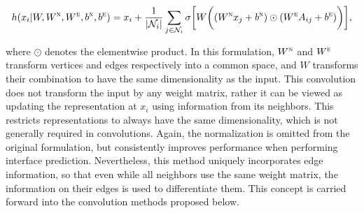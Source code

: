 \begin{equation}
h(x_i | W, W^\textsc{n}, W^\textsc{e}, b^\textsc{n}, b^\textsc{e})= x_i + \frac{1}{|\mathcal{N}_i|} \sum_{j \in \mathcal{N}_i} \sigma \bigg[ W \bigg( (W^\textsc{n} x_j + b^\textsc{n}) \odot (W^\textsc{e} A_{ij} + b^\textsc{e}) \bigg) \bigg],
\label{eq:deep_tensor}
\end{equation}

\noindent
where $\odot$ denotes the elementwise product.
In this formulation, $W^\textsc{n}$ and $W^\textsc{e}$ transform vertices and edges respectively into a common space, and $W$ transforms their combination to have the same dimensionality as the input. 
This convolution does not transform the input by any weight matrix, rather it can be viewed as updating the representation at $x_i$ using information from its neighbors.
This restricts representations to always have the same dimensionality, which is not generally required in convolutions. 
Again, the normalization is omitted from the original formulation, but consistently improves performance when performing interface prediction.
Nevertheless, this method uniquely incorporates edge information, so that even while all neighbors use the same weight matrix, the information on their edges is used to differentiate them.
This concept is carried forward into the convolution methods proposed below.



